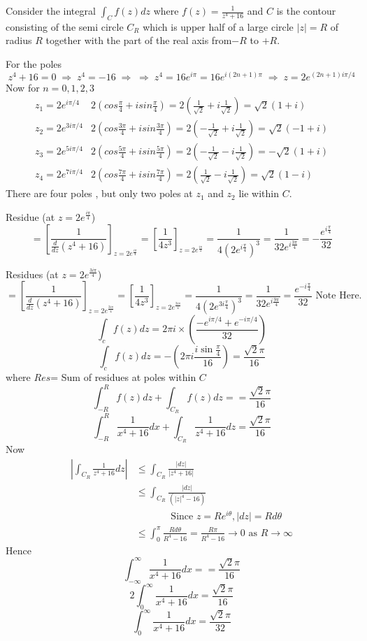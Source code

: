 \begin{solution}
Consider the integral $\int_{C}f(z)dz$ where $f(z)=\frac{1}{z^{4}+16}$
and $C$ is the contour consisting of the semi circle $C_{R}$ which
is upper half of a large circle $|z|=R$ of radius $R$ together with
the part of the real axis from$-R$ to $+R$. 

For the poles 
\[z^{4}+16=  0 \; \Rightarrow \; z^{4}=  -16 \; \Rightarrow \; \Rightarrow \; z^{4}=  16e^{i\pi}=16e^{i(2n+1)\pi} \;\Rightarrow \;
z=  2e^{(2n+1)i\pi/4} \]
Now for $n=0,1,2,3
$\begin{align*}
z_{1}=2e^{i\pi/4} & 2(cos\frac{\pi}{4}+isin\frac{\pi}{4})=2(\frac{1}{\sqrt{2}}+i\frac{1}{\sqrt{2}})=\sqrt{2}(1+i)\\
z_{2}=2e^{3i\pi/4} & 2(cos\frac{3\pi}{4}+isin\frac{3\pi}{4})=2(-\frac{1}{\sqrt{2}}+i\frac{1}{\sqrt{2}})=\sqrt{2}(-1+i)\\
z_{3}=2e^{5i\pi/4} & 2(cos\frac{5\pi}{4}+isin\frac{5\pi}{4})=2(-\frac{1}{\sqrt{2}}-i\frac{1}{\sqrt{2}})=-\sqrt{2}(1+i)\\
z_{4}=2e^{7i\pi/4} & 2(cos\frac{7\pi}{4}+isin\frac{7\pi}{4})=2(\frac{1}{\sqrt{2}}-i\frac{1}{\sqrt{2}})=\sqrt{2}(1-i)
\end{align*}
There are four poles , but only two poles at $z_{1}$ and $z_{2}$
lie within $C$. 

Residue (at $z=2e^{\frac{i\pi}{4}}$)\[
=\left[\frac{1}{\frac{d}{dz}(z^{4}+16)}\right]_{z=2e^{\frac{i\pi}{4}}}=\left[\frac{1}{4z^{3}}\right]_{z=2e^{\frac{i\pi}{4}}}=\frac{1}{4(2e^{i\frac{\pi}{4}})^{3}}=\frac{1}{32e^{i\frac{3\pi}{4}}}=-\frac{e^{i\frac{\pi}{4}}}{32}\]


Residues (at $z=2e^{\frac{3i\pi}{4}}$)\[
=\left[\frac{1}{\frac{d}{dz}(z^{4}+16)}\right]_{z=2e^{\frac{3i\pi}{4}}}=\left[\frac{1}{4z^{3}}\right]_{z=2e^{\frac{3i\pi}{4}}}=\frac{1}{4(2e^{3i\frac{\pi}{4}})^{3}}=\frac{1}{32e^{i\frac{9\pi}{4}}}=\frac{e^{-i\frac{\pi}{4}}}{32}\text{ Note Here.}\]
\[\int_{c}f(z)dz=2\pi i\times\left(\frac{-e^{i\pi/4}+e^{-i\pi/4}}{32}\right)\]
\[\int_{c}f(z)dz=-\left(2\pi i\frac{i\sin\frac{\pi}{4}}{16}\right)=\frac{\sqrt{2}\pi}{16}\]
where $Res$= Sum of residues at poles within $C$
\[\int_{-R}^{R}f(z)dz+\int_{C_{R}}f(z)dz==\frac{\sqrt{2}\pi}{16}\]
\[\int_{-R}^{R}\frac{1}{x^{4}+16}dx+\int_{C_{R}}\frac{1}{z^{4}+16}dz=\frac{\sqrt{2}\pi}{16}\]
 Now \begin{align*}
\left|\int_{C_{R}}\frac{1}{z^{4}+16}dz\right| & \le\int_{C_{R}}\frac{|dz|}{\left|z^{4}+16\right|}\\
 & \le\int_{C_{R}}\frac{|dz|}{(\left|z\right|^{4}-16)}\\
 & \;\;\;\;\;\;\;\;\;\;\;\;\;\text{Since }z=Re^{i\theta},|dz|=Rd\theta\\
 & \le\int_{0}^{\pi}\frac{Rd\theta}{R^{4}-16}=\frac{R\pi}{R^{4}-16}\rightarrow0\text{ as }R\rightarrow\infty\end{align*}
Hence \[\int_{-\infty}^{\infty}\frac{1}{x^{4}+16}dx==\frac{\sqrt{2}\pi}{16}\]
\[2\int_{0}^{\infty}\frac{1}{x^{4}+16}dx=\frac{\sqrt{2}\pi}{16}\]
\[\int_{0}^{\infty}\frac{1}{x^{4}+16}dx=\frac{\sqrt{2}\pi}{32}\]
\end{solution}

